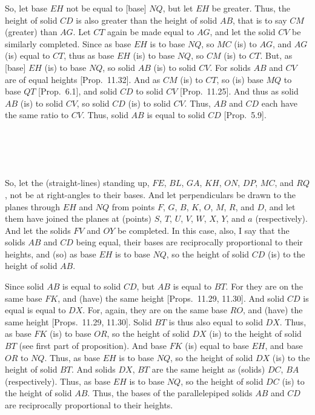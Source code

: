 \begin{Parallel}{}{}
{So, let base $EH$ not be equal to [base] $NQ$, but let $EH$ be greater.
Thus, the height of solid $CD$ is also greater than the height of
solid $AB$, that is to say $CM$ (greater) than $AG$. Let $CT$ again
be made equal to $AG$, and let the solid $CV$ be similarly
completed.  Since as base $EH$ is to base $NQ$, so $MC$ (is) to
$AG$, and $AG$ (is) equal to $CT$, thus as base $EH$ (is) to
base $NQ$, so $CM$ (is) to $CT$.  But, as [base] $EH$ (is) to base
$NQ$, so solid $AB$ (is) to solid $CV$. For solids $AB$ and $CV$ are of equal heights [Prop.~11.32].
And as $CM$ (is) to $CT$, so (is) base $MQ$ to base $QT$ [Prop.~6.1], and solid $CD$ to solid $CV$ [Prop.~11.25]. And thus as solid $AB$ (is) to solid
$CV$, so solid $CD$ (is) to solid $CV$. Thus, $AB$ and $CD$ each
have the same ratio to $CV$. Thus, solid $AB$ is equal to solid
$CD$ [Prop.~5.9].\\~\\~\\~\\~\\

\epsfysize=3in
\centerline{}

So, let the (straight-lines) standing up, $FE$, $BL$, $GA$, $KH$, $ON$,
$DP$, $MC$, and $RQ$, not be at right-angles to their bases.
And let perpendiculars be drawn to the planes through $EH$ and
$NQ$ from points $F$, $G$, $B$, $K$, $O$, $M$, $R$, and $D$, 
and let them have joined the planes at (points) $S$, $T$, $U$, $V$, $W$,
$X$, $Y$, and $a$ (respectively). And let the solids $FV$ and $OY$
be completed. In this case,  also, I say that the solids $AB$ and
$CD$ being equal, their bases are reciprocally proportional to their
heights, and (so) as base $EH$ is to base $NQ$, so the height of
solid $CD$ (is) to the height of solid $AB$.

Since solid $AB$ is equal to solid $CD$, but $AB$ is equal
to $BT$. For they are on the same base $FK$, and (have) the
same height [Props.~11.29, 11.30]. And solid $CD$ is equal is equal to $DX$. For, again,  they are on the same base $RO$, and (have) the same height [Props.~11.29, 11.30]. Solid
$BT$ is thus also equal to solid $DX$. Thus, as base $FK$ (is) to base $OR$,
so the height of solid $DX$ (is) to the height of solid $BT$ (see first part of 
proposition). And base
$FK$ (is) equal to base $EH$, and base $OR$ to $NQ$. Thus, as base
$EH$ is to base $NQ$, so the height of solid $DX$ (is) to the height
of solid $BT$. And solids $DX$, $BT$ are the same
height as (solids) $DC$,  $BA$ (respectively). Thus, as base $EH$
is to base $NQ$, so the height of solid $DC$ (is) to the height of solid
$AB$.  Thus, the bases of the parallelepiped solids $AB$ and $CD$
are reciprocally proportional to their heights.

}
\end{Parallel}
